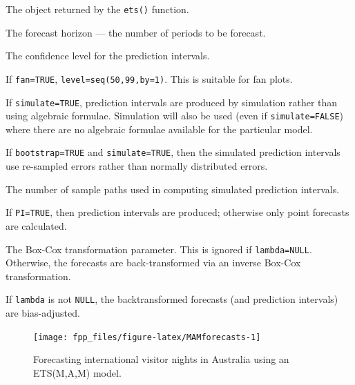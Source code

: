 \documentclass[]{book}
\newenvironment{Shaded}{\begin{snugshade}}{\end{snugshade}}
\newcommand{\DataTypeTok}[1]{\textcolor[rgb]{0.13,0.29,0.53}{#1}}
\newcommand{\DecValTok}[1]{\textcolor[rgb]{0.00,0.00,0.81}{#1}}
\newcommand{\KeywordTok}[1]{\textcolor[rgb]{0.13,0.29,0.53}{\textbf{#1}}}
\newcommand{\NormalTok}[1]{#1}
\newcommand{\OperatorTok}[1]{\textcolor[rgb]{0.81,0.36,0.00}{\textbf{#1}}}
\newcommand{\StringTok}[1]{\textcolor[rgb]{0.31,0.60,0.02}{#1}}
\providecommand{\tightlist}{%
  \setlength{\itemsep}{0pt}\setlength{\parskip}{0pt}}
\begin{document}
\begin{description}
\tightlist
\item[\texttt{object}]
The object returned by the \texttt{ets()} function.
\item[\texttt{h}]
The forecast horizon --- the number of periods to be forecast.
\item[\texttt{level}]
The confidence level for the prediction intervals.
\item[\texttt{fan}]
If \texttt{fan=TRUE}, \texttt{level=seq(50,99,by=1)}. This is suitable for fan plots.
\item[\texttt{simulate}]
If \texttt{simulate=TRUE}, prediction intervals are produced by simulation rather than using algebraic formulae. Simulation will also be used (even if \texttt{simulate=FALSE}) where there are no algebraic formulae available for the particular model.
\item[\texttt{bootstrap}]
If \texttt{bootstrap=TRUE} and \texttt{simulate=TRUE}, then the simulated prediction intervals use re-sampled errors rather than normally distributed errors.
\item[\texttt{npaths}]
The number of sample paths used in computing simulated prediction intervals.
\item[\texttt{PI}]
If \texttt{PI=TRUE}, then prediction intervals are produced; otherwise only point forecasts are calculated.
\item[\texttt{lambda}]
The Box-Cox transformation parameter. This is ignored if \texttt{lambda=NULL}. Otherwise, the forecasts are back-transformed via an inverse Box-Cox transformation.
\item[\texttt{biasadj}]
If \texttt{lambda} is not \texttt{NULL}, the backtransformed forecasts (and prediction intervals) are bias-adjusted.
\end{description}

\begin{Shaded}
\end{Shaded}

\begin{figure}

{\centering \texttt{[image: fpp\_files/figure-latex/MAMforecasts-1]} 

}

\caption{Forecasting international visitor nights in Australia using an ETS(M,A,M) model.}\label{fig:MAMforecasts}
\end{figure}
\end{document}
